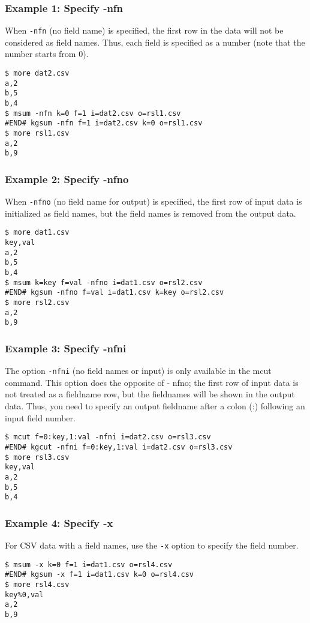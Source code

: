 \subsubsection*{Example 1: Specify -nfn}

When \verb|-nfn| (no field name) is specified, the first row in the data will not be considered as field names. Thus, each field is specified as a number (note that the number starts from 0). 


\begin{Verbatim}[baselinestretch=0.7,frame=single]
$ more dat2.csv
a,2
b,5
b,4
$ msum -nfn k=0 f=1 i=dat2.csv o=rsl1.csv
#END# kgsum -nfn f=1 i=dat2.csv k=0 o=rsl1.csv
$ more rsl1.csv
a,2
b,9
\end{Verbatim}
\subsubsection*{Example 2: Specify -nfno}

When \verb|-nfno| (no field name for output) is specified, the first row of input data is initialized as field names, but the field names is removed from the output data.


\begin{Verbatim}[baselinestretch=0.7,frame=single]
$ more dat1.csv
key,val
a,2
b,5
b,4
$ msum k=key f=val -nfno i=dat1.csv o=rsl2.csv
#END# kgsum -nfno f=val i=dat1.csv k=key o=rsl2.csv
$ more rsl2.csv
a,2
b,9
\end{Verbatim}
\subsubsection*{Example 3: Specify -nfni}

The option \verb|-nfni| (no field names or input) is only available in the mcut command. This option does the opposite of - nfno; the first row of input data is not treated as a fieldname row, but the fieldnames will be shown in the output data. Thus, you need to specify an output fieldname after a colon (:) following an input field number.


\begin{Verbatim}[baselinestretch=0.7,frame=single]
$ mcut f=0:key,1:val -nfni i=dat2.csv o=rsl3.csv
#END# kgcut -nfni f=0:key,1:val i=dat2.csv o=rsl3.csv
$ more rsl3.csv
key,val
a,2
b,5
b,4
\end{Verbatim}
\subsubsection*{Example 4: Specify -x}

For CSV data with a field names, use the \verb|-x| option to specify the field number.


\begin{Verbatim}[baselinestretch=0.7,frame=single]
$ msum -x k=0 f=1 i=dat1.csv o=rsl4.csv
#END# kgsum -x f=1 i=dat1.csv k=0 o=rsl4.csv
$ more rsl4.csv
key%0,val
a,2
b,9
\end{Verbatim}

